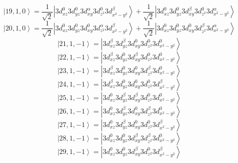 \documentclass[11pt]{article}
\begin{document}
\begin{equation*}
\left|19,1,0\right>=\frac{1}{\sqrt{2}}\left|3d_{xz}^{0}3d_{yz}^{0}3d_{xy}^{\alpha}3d_{z^2}^{0}3d_{x^2-y^2}^{\beta}\right>+\frac{1}{\sqrt{2}}\left|3d_{xz}^{0}3d_{yz}^{0}3d_{xy}^{\beta}3d_{z^2}^{0}3d_{x^2-y^2}^{\alpha}\right>\end{equation*}
\begin{equation*}
\left|20,1,0\right>=\frac{1}{\sqrt{2}}\left|3d_{xz}^{0}3d_{yz}^{0}3d_{xy}^{0}3d_{z^2}^{\alpha}3d_{x^2-y^2}^{\beta}\right>+\frac{1}{\sqrt{2}}\left|3d_{xz}^{0}3d_{yz}^{0}3d_{xy}^{0}3d_{z^2}^{\beta}3d_{x^2-y^2}^{\alpha}\right>\end{equation*}
\begin{equation*}
\left|21,1,-1\right>=\left|3d_{xz}^{\beta}3d_{yz}^{\beta}3d_{xy}^{0}3d_{z^2}^{0}3d_{x^2-y^2}^{0}\right>\end{equation*}
\begin{equation*}
\left|22,1,-1\right>=\left|3d_{xz}^{\beta}3d_{yz}^{0}3d_{xy}^{\beta}3d_{z^2}^{0}3d_{x^2-y^2}^{0}\right>\end{equation*}
\begin{equation*}
\left|23,1,-1\right>=\left|3d_{xz}^{\beta}3d_{yz}^{0}3d_{xy}^{0}3d_{z^2}^{\beta}3d_{x^2-y^2}^{0}\right>\end{equation*}
\begin{equation*}
\left|24,1,-1\right>=\left|3d_{xz}^{\beta}3d_{yz}^{0}3d_{xy}^{0}3d_{z^2}^{0}3d_{x^2-y^2}^{\beta}\right>\end{equation*}
\begin{equation*}
\left|25,1,-1\right>=\left|3d_{xz}^{0}3d_{yz}^{\beta}3d_{xy}^{\beta}3d_{z^2}^{0}3d_{x^2-y^2}^{0}\right>\end{equation*}
\begin{equation*}
\left|26,1,-1\right>=\left|3d_{xz}^{0}3d_{yz}^{\beta}3d_{xy}^{0}3d_{z^2}^{\beta}3d_{x^2-y^2}^{0}\right>\end{equation*}
\begin{equation*}
\left|27,1,-1\right>=\left|3d_{xz}^{0}3d_{yz}^{\beta}3d_{xy}^{0}3d_{z^2}^{0}3d_{x^2-y^2}^{\beta}\right>\end{equation*}
\begin{equation*}
\left|28,1,-1\right>=\left|3d_{xz}^{0}3d_{yz}^{0}3d_{xy}^{\beta}3d_{z^2}^{\beta}3d_{x^2-y^2}^{0}\right>\end{equation*}
\begin{equation*}
\left|29,1,-1\right>=\left|3d_{xz}^{0}3d_{yz}^{0}3d_{xy}^{\beta}3d_{z^2}^{0}3d_{x^2-y^2}^{\beta}\right>\end{equation*}
\end{document}
